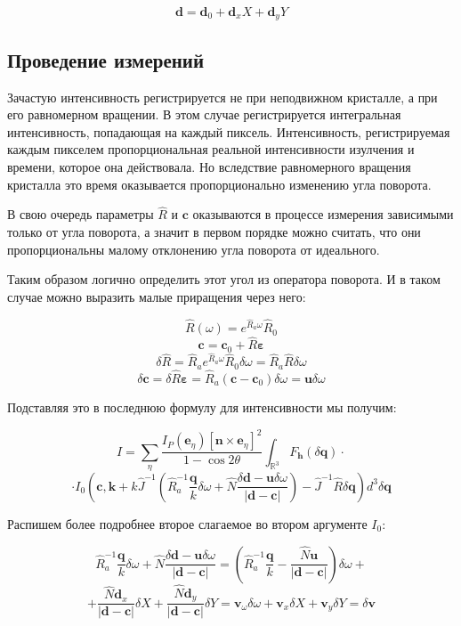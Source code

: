 \documentclass[12pt]{article}
\begin{document}
\[ \pmb{d} = \pmb{d}_0 + \pmb{d}_x X + \pmb{d}_y Y\]

\subsection*{Проведение измерений}

Зачастую интенсивность регистрируется не при неподвижном кристалле, а при
его равномерном вращении. В этом случае регистрируется интегральная интенсивность,
попадающая на каждый пиксель. Интенсивность, регистрируемая каждым пикселем пропорциональная
реальной интенсивности изулчения и времени, которое она действовала. Но вследствие
равномерного вращения кристалла это время оказывается пропорционально изменению угла поворота.

В свою очередь параметры $\hat{R}$ и $\pmb{c}$ оказываются в процессе измерения
зависимыми только от угла поворота, а значит в первом порядке можно считать, что
они пропорциональны малому отклонению угла поворота от идеального.

Таким образом логично определить этот угол из оператора поворота. И в таком случае
можно выразить малые приращения через него:

\[ \hat{R}(\omega) = e^{\hat{R}_a \omega} \hat{R}_0 \]
\[ \pmb{c} = \pmb{c}_0 + \hat{R} \pmb{\varepsilon} \]
\[ \delta \hat{R} = \hat{R}_a e^{\hat{R}_a \omega} \hat{R}_0 \delta \omega =
\hat{R}_a \hat{R} \delta \omega \]
\[ \delta \pmb{c} = \delta \hat{R} \pmb{\varepsilon} =
\hat{R}_a (\pmb{c} - \pmb{c}_0) \delta \omega = \pmb{u} \delta \omega \]

Подставляя это в последнюю формулу для интенсивности мы получим:

\[ I = \sum_\eta \frac{I_P(\pmb{e}_\eta)\left[ \pmb{n} \times \pmb{e}_\eta \right]^2}{1 - \cos{2\theta}}
\int_{\mathbb{R}^3} F_{\pmb{h}}(\delta \pmb{q}) \cdot \]
\[ \cdot I_0\left(\pmb{c}, \pmb{k} + k \hat{J}^{-1}\left(\hat{R}_a^{-1} \frac{\pmb{q}}{k} \delta \omega +
\hat{N}\frac{\delta \pmb{d} - \pmb{u} \delta \omega}{|\pmb{d} - \pmb{c}|} \right) -
\hat{J}^{-1} \hat{R} \delta \pmb{q}\right) d^3 \delta \pmb{q} \]

Распишем более подробнее второе слагаемое во втором аргументе $I_0$:

\[ \hat{R}_a^{-1} \frac{\pmb{q}}{k} \delta \omega + \hat{N}\frac{\delta \pmb{d} -
\pmb{u} \delta \omega}{|\pmb{d} - \pmb{c}|} =
\left(\hat{R}_a^{-1} \frac{\pmb{q}}{k} - \frac{\hat{N}\pmb{u}}{|\pmb{d} - \pmb{c}|}\right) \delta \omega + \]
\[ + \frac{\hat{N}\pmb{d}_x}{|\pmb{d} - \pmb{c}|} \delta X +
\frac{\hat{N}\pmb{d}_y}{|\pmb{d} - \pmb{c}|} \delta Y =
\pmb{v}_\omega \delta \omega + \pmb{v}_x \delta X + \pmb{v}_y \delta Y = \delta \pmb{v}\]
\end{document}

